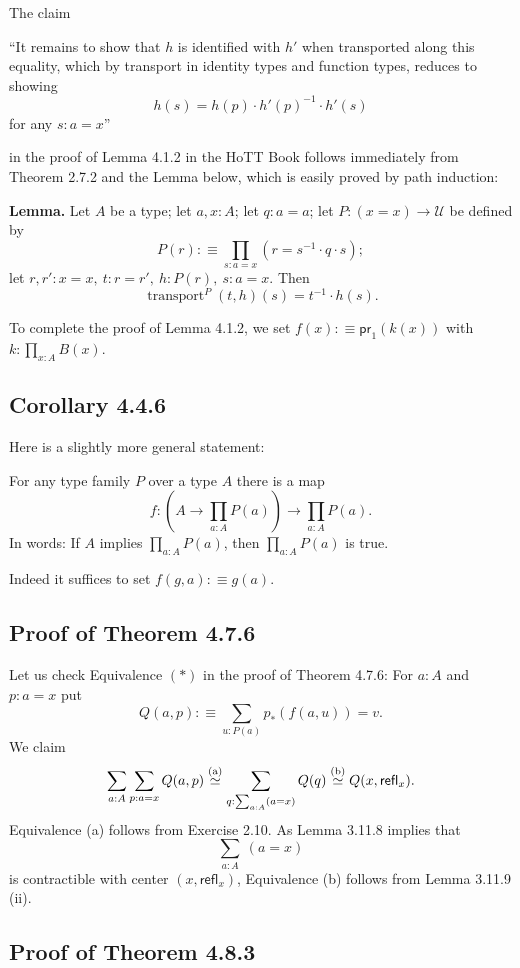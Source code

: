 \documentclass[12pt]{article}
\newcommand{\msf}{\mathsf}
\newcommand{\de}{:\equiv}
\newcommand{\ee}{\equiv}
\newcommand{\nn}{\noindent}
\newcommand{\oo}{\operatorname}
\newcommand{\refl}{\mathsf{refl}}
\newcommand{\U}{\mathcal U}
\begin{document}
The claim

\nn ``It remains to show that $h$ is identified with $h'$ when transported along this equality, which by transport in identity types and function types, reduces to showing 
$$
h(s)=h(p)\cdot h'(p)^{-1}\cdot h'(s)
$$ 
for any $s:a=x$''

\nn in the proof of Lemma 4.1.2 in the HoTT Book follows immediately from Theorem 2.7.2 and the Lemma below, which is easily proved by path induction:

\nn \textbf{Lemma.} Let $A$ be a type; let $a,x:A$; let $q:a=a$; let $P:(x=x)\to\U$ be defined by 
$$
P(r):\equiv\prod_{s:a=x}(r=s^{-1}\cdot q\cdot s);
$$ 
let $r,r':x=x,\ t:r=r',\ h:P(r),\ s:a=x$. Then 
$$
\oo{transport}^P(t,h)(s)=t^{-1}\cdot h(s).
$$ 

To complete the proof of Lemma 4.1.2, we set $f(x):\ee\msf{pr}_1(k(x))$ with $k:\prod_{x:A}B(x)$.


\subsection{Corollary 4.4.6}

Here is a slightly more general statement:

For any type family $P$ over a type $A$ there is a map
$$
f:\left(A\to\prod_{a:A}P(a)\right)\to\prod_{a:A}P(a).
$$ 
In words: If $A$ implies $\prod_{a:A}P(a)$, then $\prod_{a:A}P(a)$ is true.

Indeed it suffices to set $f(g,a)\de g(a)$.


\subsection{Proof of Theorem 4.7.6}

Let us check Equivalence $(*)$ in the proof of Theorem 4.7.6: For $a:A$ and $p:a=x$ put 
$$
Q(a,p):\equiv\sum_{u:P(a)}p_*(f(a,u))=v.
$$ 
We claim 
$$
\sum_{a:A}\sum_{p:a=x}Q(a,p)\overset{(\text a)}{\simeq}
\sum_{q:\sum_{a:A}(a=x)}Q(q)\overset{(\text b)}{\simeq}
Q(x,\refl_x).
$$
Equivalence (a) follows from Exercise 2.10. As Lemma 3.11.8 implies that $$\sum_{a:A}\ (a=x)$$ is contractible with center $(x,\refl_x)$, Equivalence (b) follows from Lemma 3.11.9 (ii). 


\subsection{Proof of Theorem 4.8.3}
\end{document}
